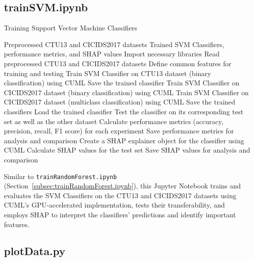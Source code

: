 \subsection{trainSVM.ipynb}\label{subsec:trainSVM.ipynb}

\begin{algorithm}[H]
\caption{Training Support Vector Machine Classifiers}\label{alg:trainSVM} 
\begin{algorithmic}[1]
\Require%
Preprocessed CTU13 and CICIDS2017 datasets
\Ensure%
Trained SVM Classifiers, performance metrics, and SHAP values  
\State%
Import necessary libraries
\State%
Read preprocessed CTU13 and CICIDS2017 datasets
\State%
Define common features for training and testing
        \State%
        Train SVM Classifier on CTU13 dataset (binary classification) using CUML
        \State%
        Save the trained classifier
        \State%
        Train SVM Classifier on CICIDS2017 dataset (binary classification) using CUML
        \State%
        Train SVM Classifier on CICIDS2017 dataset (multiclass classification) using CUML
        \State%
        Save the trained classifiers
    \EndIf%
\EndFor%
    \State%
    Load the trained classifier
    \State%
    Test the classifier on its corresponding test set as well as the other dataset
    \State%
    Calculate performance metrics (accuracy, precision, recall, F1 score) for each experiment
    \State%
    Save performance metrics for analysis and comparison
    \State%
    Create a SHAP explainer object for the classifier using CUML
    \State%
    Calculate SHAP values for the test set
    \State%
    Save SHAP values for analysis and comparison
\EndFor%
\end{algorithmic}
\end{algorithm}

Similar to \texttt{trainRandomForest.ipynb} (Section~\ref{subsec:trainRandomForest.ipynb}), this Jupyter Notebook trains and evaluates the SVM Classifiers on the CTU13 and CICIDS2017 datasets using CUML's GPU-accelerated implementation, tests their transferability, and employs SHAP to interpret the classifiers' predictions and identify important features.

\subsection{plotData.py}\label{subsec:plotData.py}



